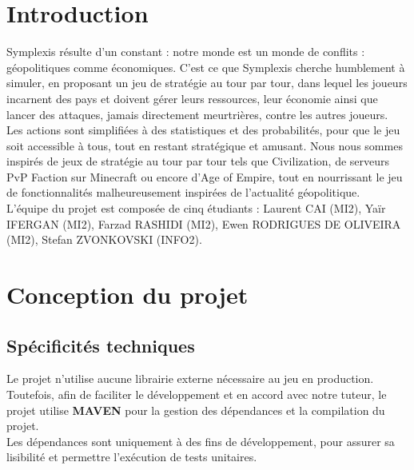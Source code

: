 \documentclass{article}
\begin{document}

\tableofcontents

\section{Introduction}

Symplexis résulte d'un constant : notre monde est un monde de conflits : géopolitiques comme économiques. C'est ce que Symplexis cherche humblement à simuler, en proposant un jeu de stratégie au tour par tour, dans lequel les joueurs incarnent des pays et doivent gérer leurs ressources, leur économie ainsi que lancer des attaques, jamais directement meurtrières, contre les autres joueurs.\\

Les actions sont simplifiées à des statistiques et des probabilités, pour que le jeu soit accessible à tous, tout en restant stratégique et amusant. Nous nous sommes inspirés de jeux de stratégie au tour par tour tels que Civilization, de serveurs PvP Faction sur Minecraft ou encore d'Age of Empire, tout en nourrissant le jeu de fonctionnalités malheureusement inspirées de l'actualité géopolitique.\\

L'équipe du projet est composée de cinq étudiants : Laurent CAI (MI2), Yaïr IFERGAN (MI2), Farzad RASHIDI (MI2), Ewen RODRIGUES DE OLIVEIRA (MI2), Stefan ZVONKOVSKI (INFO2).

\section{Conception du projet}
\subsection{Spécificités techniques}
Le projet n'utilise aucune librairie externe nécessaire au jeu en production. Toutefois, afin de faciliter le développement et en accord avec notre tuteur, le projet utilise \textbf{MAVEN} pour la gestion des dépendances et la compilation du projet.\\
Les dépendances sont uniquement à des fins de développement, pour assurer sa lisibilité et permettre l'exécution de tests unitaires.\\
\end{document}
